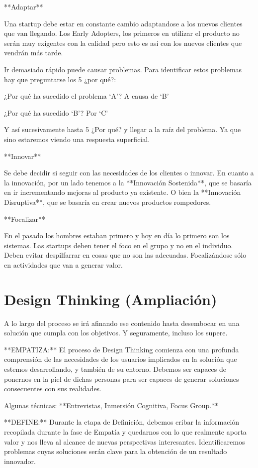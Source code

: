 \documentclass[12pt,twoside,titlepage]{report}
\begin{document}
**Adaptar**

Una startup debe estar en constante cambio adaptandose a los nuevos clientes que van llegando. Los Early Adopters, los primeros en utilizar el producto no serán muy exigentes con la calidad pero esto es así con los nuevos clientes que vendrán más tarde.

Ir demasiado rápido puede causar problemas. Para identificar estos problemas hay que preguntarse los 5 ¿por qué?:

¿Por qué ha sucedido el problema ‘A’? A causa de ‘B’

¿Por qué ha sucedido ‘B’? Por ‘C’

Y así sucesivamente hasta 5 ¿Por qué? y llegar a la raíz del problema. Ya que sino estaremos viendo una respuesta superficial.

**Innovar**

Se debe decidir si seguir con las necesidades de los clientes o innovar. En cuanto a la innovación, por un lado tenemos a la **Innovación Sostenida**, que se basaría en ir incrementando mejoras al producto ya existente. O bien la **Innovación Disruptiva**, que se basaría en crear nuevos productos rompedores.

**Focalizar**

En el pasado los hombres estaban primero y hoy en día lo primero son los sistemas. Las startups deben tener el foco en el grupo y no en el individuo. Deben evitar despilfarrar en cosas que no son las adecuadas. Focalizándose sólo en actividades que van a generar valor.

\section{Design Thinking (Ampliación)}

A lo largo del proceso se irá afinando ese contenido hasta desembocar en una solución que cumpla con los objetivos. Y seguramente, incluso los supere.

**EMPATIZA:** El proceso de Design Thinking comienza con una profunda comprensión de las necesidades de los usuarios implicados en la solución que estemos desarrollando, y también de su entorno. Debemos ser capaces de ponernos en la piel de dichas personas para ser capaces de generar soluciones consecuentes con sus realidades.

Algunas técnicas: **Entrevistas, Inmersión Cognitiva, Focus Group.**

**DEFINE:** Durante la etapa de Definición, debemos cribar la información recopilada durante la fase de Empatía y quedarnos con lo que realmente aporta valor y nos lleva al alcance de nuevas perspectivas interesantes. Identificaremos problemas cuyas soluciones serán clave para la obtención de un resultado innovador.
\end{document}
